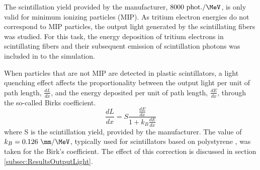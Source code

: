 The scintillation yield provided by the manufacturer, $8000~\text{phot.}/\MeV$, is only valid for minimum ionizing particles (MIP). As tritium electron energies do not correspond to MIP particles, the output light generated by the scintillating fibers was studied. For this task, the energy deposition of tritium electrons in scintillating fibers and their subsequent emission of scintillation photons was included in to the simulation.

When particles that are not MIP are detected in plastic scintillators, a light quenching effect affects the proportionality between the output light per unit of path length, $\frac{dL}{dx}$, and the energy deposited per unit of path length, $\frac{dE}{dx}$, through the so-called Birks coefficient\cite{BirksPaper}.
\begin{equation}
\frac{dL}{dx}= S\frac{\displaystyle{\frac{dE}{dx}}}{1+k_B\displaystyle{\frac{dE}{dx}}}
\label{eq:birkscoefficient}
\end{equation}
where S is the scintillation yield, provided by the manufacturer. The value of $k_B=0.126~\mm/\MeV$, typically used for scintillators based on polystyrene \cite{BirksCoefficient}, was taken for the Birk's coefficient. The effect of this correction is discussed in section \ref{subsec:ResultsOutputLight}.